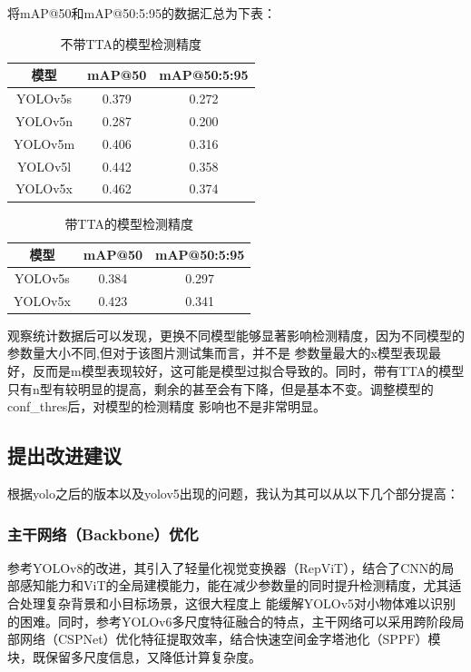 \documentclass[UTF8]{ctexart}
\begin{document}
将mAP@50和mAP@50:5:95的数据汇总为下表：
\begin{table}[!ht]
    \centering
    \renewcommand{\arraystretch}{1.5}
    \caption{不带TTA的模型检测精度}
    \begin{tabular}{|c|c|c|}
    \hline
        模型 & mAP@50 & mAP@50:5:95 \\ \hline
        YOLOv5s & 0.379 & 0.272 \\ \hline
        YOLOv5n & 0.287 & 0.200 \\ \hline
        YOLOv5m & 0.406 & 0.316 \\ \hline
        YOLOv5l & 0.442 & 0.358 \\ \hline
        YOLOv5x & 0.462 & 0.374 \\ \hline
    \end{tabular}

\end{table}
\begin{table}[!ht]
    \centering
    \renewcommand{\arraystretch}{1.5}
    \caption{带TTA的模型检测精度}
    \begin{tabular}{|c|c|c|}
    \hline
        模型 & mAP@50 & mAP@50:5:95 \\ \hline
        YOLOv5s & 0.384 & 0.297 \\ \hline
        YOLOv5x & 0.423 & 0.341 \\ \hline
    \end{tabular}
\end{table}

观察统计数据后可以发现，更换不同模型能够显著影响检测精度，因为不同模型的参数量大小不同,但对于该图片测试集而言，并不是
参数量最大的x模型表现最好，反而是m模型表现较好，这可能是模型过拟合导致的。同时，带有TTA的模型只有n型有较明显的提高，剩余的甚至会有下降，但是基本不变。调整模型的conf\_thres后，对模型的检测精度
影响也不是非常明显。

\subsection{提出改进建议}
根据yolo之后的版本以及yolov5出现的问题，我认为其可以从以下几个部分提高：
\subsubsection{主干网络（Backbone）优化}
参考YOLOv8的改进，其引入了轻量化视觉变换器（RepViT），结合了CNN的局部感知能力和ViT的全局建模能力，能在减少参数量的同时提升检测精度，尤其适合处理复杂背景和小目标场景，这很大程度上
能缓解YOLOv5对小物体难以识别的困难。同时，参考YOLOv6多尺度特征融合的特点，主干网络可以采用跨阶段局部网络（CSPNet）优化特征提取效率，结合快速空间金字塔池化（SPPF）模块，既保留多尺度信息，又降低计算复杂度。
\end{document}
